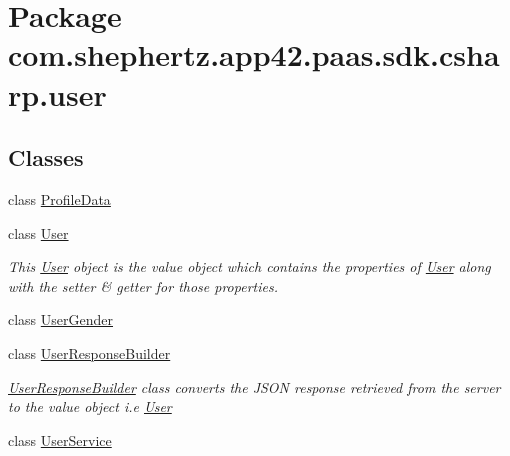 \hypertarget{namespacecom_1_1shephertz_1_1app42_1_1paas_1_1sdk_1_1csharp_1_1user}{\section{Package com.\+shephertz.\+app42.\+paas.\+sdk.\+csharp.\+user}
\label{namespacecom_1_1shephertz_1_1app42_1_1paas_1_1sdk_1_1csharp_1_1user}
}
\subsection*{Classes}
\begin{DoxyCompactItemize}
\item 
class \hyperlink{classcom_1_1shephertz_1_1app42_1_1paas_1_1sdk_1_1csharp_1_1user_1_1_profile_data}{Profile\+Data}
\item 
class \hyperlink{classcom_1_1shephertz_1_1app42_1_1paas_1_1sdk_1_1csharp_1_1user_1_1_user}{User}
\begin{DoxyCompactList}\small\item\em This \hyperlink{classcom_1_1shephertz_1_1app42_1_1paas_1_1sdk_1_1csharp_1_1user_1_1_user}{User} object is the value object which contains the properties of \hyperlink{classcom_1_1shephertz_1_1app42_1_1paas_1_1sdk_1_1csharp_1_1user_1_1_user}{User} along with the setter \& getter for those properties. \end{DoxyCompactList}\item 
class \hyperlink{classcom_1_1shephertz_1_1app42_1_1paas_1_1sdk_1_1csharp_1_1user_1_1_user_gender}{User\+Gender}
\item 
class \hyperlink{classcom_1_1shephertz_1_1app42_1_1paas_1_1sdk_1_1csharp_1_1user_1_1_user_response_builder}{User\+Response\+Builder}
\begin{DoxyCompactList}\small\item\em \hyperlink{classcom_1_1shephertz_1_1app42_1_1paas_1_1sdk_1_1csharp_1_1user_1_1_user_response_builder}{User\+Response\+Builder} class converts the J\+S\+O\+N response retrieved from the server to the value object i.\+e \hyperlink{classcom_1_1shephertz_1_1app42_1_1paas_1_1sdk_1_1csharp_1_1user_1_1_user}{User} \end{DoxyCompactList}\item 
class \hyperlink{classcom_1_1shephertz_1_1app42_1_1paas_1_1sdk_1_1csharp_1_1user_1_1_user_service}{User\+Service}

\end{DoxyCompactItemize}
